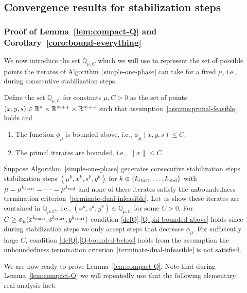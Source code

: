\documentclass{article}
\begin{document}
\subsection{Convergence results for stabilization steps}

\subsubsection{Proof of Lemma~\ref{lem:compact-Q} and Corollary~\ref{coro:bound-everything}} \label{sec:lem:compact-Q}


We now introduce the set $\mathbb{Q}_{\mu, C}$ which we will use to represent the set of possible points the iterates of Algorithm~\ref{simple-one-phase} can take for a fixed $\mu$, i.e., during consecutive stabilization steps.

\begin{definition}\label{defQ}
Define the set $\mathbb{Q}_{\mu, C}$ for constants $\mu, C > 0$ as the set of points $(x,y,s) \in  \mathbb{R}^{n} \times \mathbb{R}^{m++} \times \mathbb{R}^{m++}$ such that assumption~\ref{assume:primal-feasible} holds and
\begin{enumerate}
\item \label{Q-phi-bounded-above} The function $\phi_{\mu}$ is bounded above, i.e., $\phi_{\mu}(x,y,s) \le C$.
\item \label{Q-bounded-below} The primal iterates are bounded, i.e., $\| x \| \le C$. 
\end{enumerate}
\end{definition}

Suppose Algorithm~\ref{simple-one-phase} generates consecutive stabilization steps stabilization steps $(\mu^k, x^k, s^k, y^k)$ for $k \in \{ k_{\text{start}}, \dots, k_{\text{end}} \}$ with $\mu =\mu^{k_{\text{start}}} = \dots = \mu^{k_{\text{end}}}$ and none of these iterates satisfy the unboundedness termination criterion~\eqref{terminate-dual-infeasible}. Let us show these iterates are contained in $\mathbb{Q}_{\mu, C}$, i.e., $(x^{k}, s^{k}, y^{k}) \in \mathbb{Q}_{\mu, C}$ for some $C > 0$. For $C \ge  \phi_{\mu}(x^{k_{\text{start}}}, s^{k_{\text{start}}}, y^{k_{\text{start}}})$ condition \ref{defQ}.\ref{Q-phi-bounded-above} holds since during stabilization steps we only accept steps that decrease $\phi_{\mu}$. For sufficiently large $C$, condition \ref{defQ}.\ref{Q-bounded-below} holds from the assumption the unboundedness termination criterion~\eqref{terminate-dual-infeasible} is not satisfied.



We are now ready to prove Lemma~\ref{lem:compact-Q}. Note that during Lemma~\ref{lem:compact-Q} we will repeatedly use that the following elementary real analysis fact: 
\end{document}

